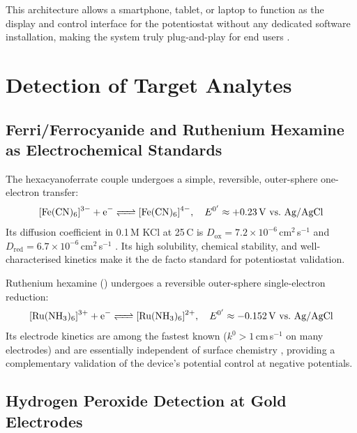 This architecture allows a smartphone, tablet, or laptop to function as the display and control interface for the potentiostat without any dedicated software installation, making the system truly plug-and-play for end users \cite{Nemiroski2014}.

\section{Detection of Target Analytes}
\label{sec:analyte_review}

\subsection{Ferri/Ferrocyanide and Ruthenium Hexamine as Electrochemical Standards}
\label{subsec:redox_probes}

The hexacyanoferrate couple \ferrocene{} undergoes a simple, reversible, outer-sphere one-electron transfer:
\begin{equation}
    \ce{[Fe(CN)6]^{3-} + e- <=> [Fe(CN)6]^{4-}}, \quad E^{0'} \approx +0.23\,\text{V vs.\ Ag/AgCl}
\end{equation}
Its diffusion coefficient in 0.1\,M KCl at 25\,\textdegree{}C is $D_\text{ox} = 7.2 \times 10^{-6}$\,cm$^2$\,s$^{-1}$ and $D_\text{red} = 6.7 \times 10^{-6}$\,cm$^2$\,s$^{-1}$ \cite{Konopka1970}. Its high solubility, chemical stability, and well-characterised kinetics make it the de facto standard for potentiostat validation.

Ruthenium hexamine (\ruhex{}) undergoes a reversible outer-sphere single-electron reduction:
\begin{equation}
    \ce{[Ru(NH3)6]^{3+} + e- <=> [Ru(NH3)6]^{2+}}, \quad E^{0'} \approx -0.152\,\text{V vs.\ Ag/AgCl}
\end{equation}
Its electrode kinetics are among the fastest known ($k^0 > 1$\,cm\,s$^{-1}$ on many electrodes) and are essentially independent of surface chemistry \cite{McCreery2008}, providing a complementary validation of the device's potential control at negative potentials.

\subsection{Hydrogen Peroxide Detection at Gold Electrodes}
\label{subsec:h2o2}

